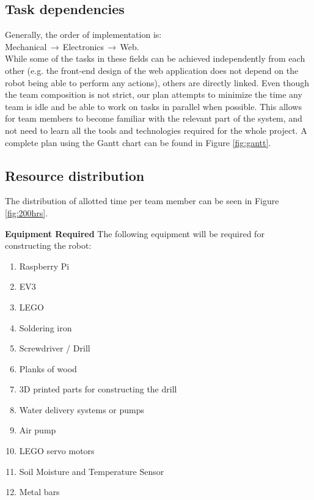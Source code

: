\documentclass{article}
\begin{document}
\subsection{Task dependencies}
Generally, the order of implementation is: \\
Mechanical$\,\to\,$Electronics$\,\to\,$Web. \\
While some of the tasks in these fields can be achieved independently from each other (e.g. the front-end design of the web application does not depend on the robot being able to perform any actions), others are directly linked. Even though the team composition is not strict, our plan attempts to minimize the time any team is idle and be able to work on tasks in parallel when possible. This allows for team members to become familiar with the relevant part of the system, and not need to learn all the tools and technologies required for the whole project. A complete plan using the Gantt chart can be found in Figure \ref{fig:gantt}.




\subsection{Resource distribution}

The distribution of allotted time per team member can be seen in Figure \ref{fig:200hrs}.


\textbf{Equipment Required} \newline
The following equipment will be required for constructing the robot: \newline

\begin{enumerate}
    \vspace{-8mm}
    \setlength{\itemsep}{0pt}%
    \setlength{\parskip}{0pt}
    \setlength{\topsep}{0pt}
    \item Raspberry Pi
    \item EV3
    \item LEGO
    \item Soldering iron
    \item Screwdriver / Drill
    \item Planks of wood
    \item 3D printed parts for constructing the drill
    \item Water delivery systems or pumps
    \item Air pump
    \item LEGO servo motors
    \item Soil Moisture and Temperature Sensor
    \item Metal bars
\end{enumerate}
\end{document}

